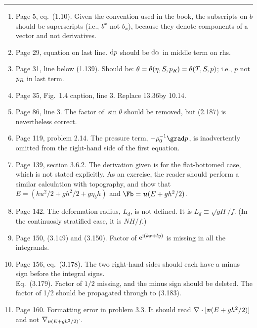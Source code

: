 \documentclass[10pt]{article}
\newcommand{\eq}{eq.\ } \newcommand{\Eq}{Eq.\ }
\begin{document}
\hrule

\begin{enumerate}

\item Page 5, \eq (1.10).  Given the  convention used in the book, the subscripts on $b$ should be superscripts (i.e., $b^x$ not $b_x$), because they denote components of a vector and not derivatives.

\item Page 29, equation on last line. $\d p$ should be $\d \alpha$ in middle term on rhs.

\item Page 31, line below (1.139). Should be: $\theta = \theta(\eta, S, \pref) = \theta (T, S, p)$; i.e., $p$ not $\pref$ in last term.

\item Page 35, Fig.\ 1.4 caption, line 3. Replace 13.36\dgc by 10.14\dgc.

\item Page 86, line 3. The factor of $\sin \theta$ should be removed, but (2.187) is nevertheless correct.

\item Page 119, problem 2.14. The pressure term, $-\ro^{-1} \grad p$, is inadvertently omitted from the right-hand side of the first equation.

\item Page 139, section 3.6.2. The derivation given is for the flat-bottomed case, which is not stated explicitly. As an exercise, the reader should perform a similar calculation with topography, and show that $E = (h u^2/2 + g h^2/2 + g \eta_b h)$ and $\Fb = \ub( E + g h^2/2)$.

\item Page 142. The deformation radius, $L_d$, is not defined. It is $L_d \equiv \sqrt{gH}/f$. (In the continuosly stratified case, it is $NH/f$.)

\item Page 150, (3.149) and (3.150). Factor of $\er^{\ir (kx + ly)}$ is missing in all the integrands.

\item Page 156, \eq (3.178). The two right-hand sides should each have a minus sign before the integral signs. \\
\Eq (3.179). Factor of $1/2$ missing, and the minus sign should be deleted. The factor of 1/2 should be propagated through to (3.183).

\item Page 160. Formatting error in problem 3.3. It should read $\div[][\vb(E + gh^2/2)]$ and not $\div[\vb(E + gh^2/2)]$.


\end{enumerate}
\end{document}
